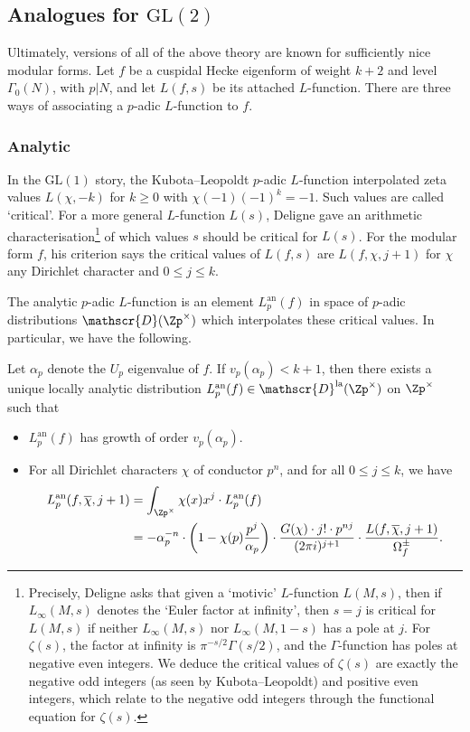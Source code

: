 \documentclass[a4paper,10pt, english, reqno]{smfart}
\newcommand{\GL}{\mathrm{GL}}
\newcommand{\ccD}{\mathscr{D}}
\numberwithin{equation}{section}
\begin{document}
\subsection{Analogues for $\mathrm{GL}(2)$}
Ultimately, versions of all of the above theory are known for sufficiently nice modular forms. Let $f$ be a cuspidal Hecke eigenform of weight $k+2$ and level $\Gamma_0(N)$, with $p|N$, and let $L(f,s)$ be its attached $L$-function. There are three ways of associating a $p$-adic $L$-function to $f$.


\subsubsection{Analytic} In the $\GL(1)$ story, the Kubota--Leopoldt $p$-adic $L$-function interpolated zeta values $L(\chi,-k)$ for $k \geq 0$ with $\chi(-1)(-1)^k = -1$. Such values are called `critical'. For a more general $L$-function $L(s)$, Deligne \cite[Def.\ 1.3]{Del79} gave an arithmetic characterisation\footnote{Precisely, Deligne asks that given a `motivic' $L$-function $L(M,s)$, then if $L_\infty(M,s)$ denotes the `Euler factor at infinity', then $s= j$ is critical for $L(M,s)$ if neither $L_\infty(M,s)$ nor $L_\infty(M,1-s)$ has a pole at $j$. For $\zeta(s)$, the factor at infinity is $\pi^{-s/2}\Gamma(s/2)$, and the $\Gamma$-function has poles at negative even integers. We deduce the critical values of $\zeta(s)$ are exactly the negative odd integers (as seen by Kubota--Leopoldt) and positive even integers, which relate to the negative odd integers through the functional equation for $\zeta(s)$.} of which values $s$ should be critical for $L(s)$. For the modular form $f$, his criterion says the critical values of $L(f,s)$ are $L(f,\chi,j+1)$ for $\chi$ any Dirichlet character and $0 \leq j \leq k$. 

The analytic $p$-adic $L$-function is an element $L_p^\mathrm{an}(f)$ in space of $p$-adic distributions $\ccD(\Zp^\times)$ which interpolates these critical values. In particular, we have the following.

\begin{theorem}\label{thm:intro 1}
	Let $\alpha_p$ denote the $U_p$ eigenvalue of $f$. If $v_p(\alpha_p) < k+1$, then there exists a unique locally analytic distribution $L_p^{\mathrm{an}}(f) \in \mathscr{D}^{\rm la}(\Zp^\times)$ on $\Zp^\times$ such that
	
	\begin{itemize}\setlength{\itemsep}{5pt}
		\item $L_p^{\mathrm{an}}(f)$ has growth of order $v_p(\alpha_p)$.
		\item For all Dirichlet characters $\chi$ of conductor $p^n$, and for all $0 \leq j \leq k$, we have
		\begin{align*}
			L_p^{\mathrm{an}}(f,\overline{\chi},j+1) &= \int_{\Zp^\times} \chi(x)x^j \cdot L_p^{\mathrm{an}}(f)\\
			&= -\alpha_p^{-n}\cdot \left(1-\chi(p)\frac{p^j}{\alpha_p}\right)\cdot\frac{G(\chi)\cdot j!\cdot p^{nj}}{(2\pi i)^{j+1}}\cdot \frac{ L(f,\overline{\chi},j+1)}{\Omega_f^\pm}.
		\end{align*}
	\end{itemize}
\end{theorem}
\end{document}
